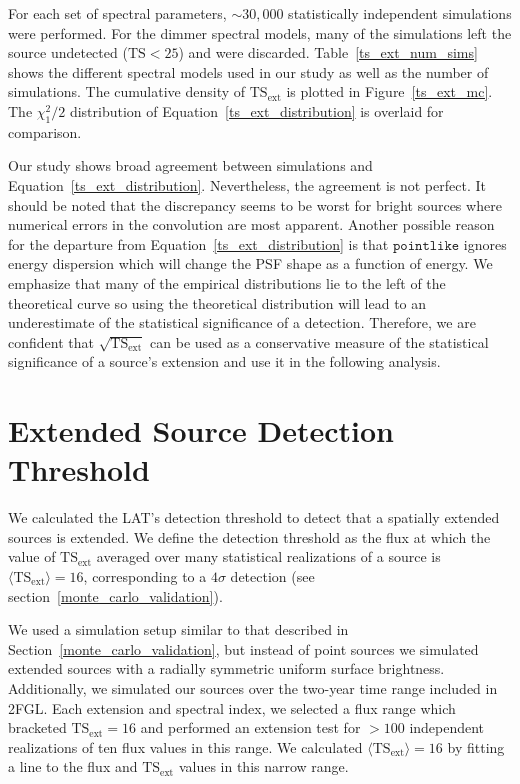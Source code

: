 \documentclass[12pt,preprint]{aastex}
\newcommand{\tsext}{{\ensuremath{\text{TS}_{\text{ext}}}}\xspace}
\newcommand{\ts}{\text{TS}\xspace}
\newcommand{\pointlike}{\ensuremath{\mathtt{pointlike}}\xspace}
\begin{document}
For each set of spectral parameters, $\sim30,000$ statistically independent
simulations were performed. For the dimmer spectral models, many of the
simulations left the source undetected ($\ts<25$)
and were discarded.  Table~\ref{ts_ext_num_sims}
shows the different spectral models used in our study as well as the
number of simulations.  The cumulative density of \tsext is plotted in
Figure~\ref{ts_ext_mc}. The $\chi^2_1/2$ distribution of
Equation~\ref{ts_ext_distribution} is overlaid for comparison.

Our study shows broad agreement between simulations and
Equation~\ref{ts_ext_distribution}. Nevertheless, the agreement is not
perfect.  It should be noted that the discrepancy seems to be worst for
bright sources where numerical errors in the convolution
are most apparent.  Another possible
reason for the departure from Equation~\ref{ts_ext_distribution} 
is that \pointlike ignores energy dispersion which will change the
PSF shape as a function of energy. We emphasize that many of
the empirical distributions lie to the left of the theoretical curve so
using the theoretical distribution will lead to an underestimate of the
statistical significance of a detection. Therefore, we are confident that
$\sqrt{\tsext}$ can be used as a conservative measure of the statistical
significance of a source's extension and use it in the following analysis.

\section{Extended Source Detection Threshold}
\label{extension_sensitivity}

We calculated the LAT's detection threshold to detect that a spatially extended
sources is extended. We define the detection threshold as the flux at which the value
of $\tsext$ averaged over many statistical realizations of a source
is $\langle\tsext\rangle=16$, corresponding to a $4\sigma$ detection
(see section~\ref{monte_carlo_validation}).

We used a simulation setup similar to that described in
Section~\ref{monte_carlo_validation}, but instead of point sources
we simulated extended
sources with a radially symmetric uniform surface
brightness. Additionally, we
simulated our sources over the two-year time range included
in 2FGL.
Each extension and
spectral index, we selected a flux range which bracketed $\tsext=16$
and performed an extension test for $>100$ independent realizations of
ten flux values in this range.
We calculated $\langle\tsext\rangle=16$ by fitting a line to the flux
and $\tsext$ values in this narrow range.
\end{document}
